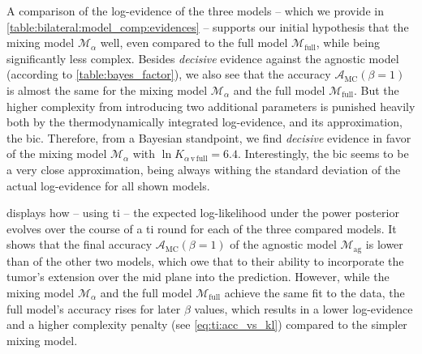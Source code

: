 \documentclass[\relativeRoot/main.tex]{subfiles}
\begin{document}
A comparison of the log-evidence of the three models -- which we provide in \cref{table:bilateral:model_comp:evidences} -- supports our initial hypothesis that the mixing model $\mathcal{M}_\alpha$ well, even compared to the full model $\mathcal{M}_\text{full}$, while being significantly less complex. Besides \emph{decisive} evidence against the agnostic model (according to \cref{table:bayes_factor}), we also see that the accuracy $\mathcal{A}_\text{MC}(\beta=1)$ is almost the same for the mixing model $\mathcal{M}_\alpha$ and the full model $\mathcal{M}_\text{full}$. But the higher complexity from introducing two additional parameters is punished heavily both by the thermodynamically integrated log-evidence, and its approximation, the \gls{bic}. Therefore, from a Bayesian standpoint, we find \emph{decisive} evidence in favor of the mixing model $\mathcal{M}_\alpha$ with $\ln{K}_{\alpha\,\text{v}\,\text{full}} = 6.4$. Interestingly, the \gls{bic} seems to be a very close approximation, being always withing the standard deviation of the actual log-evidence for all shown models.

 displays how -- using \gls{ti} -- the expected log-likelihood under the power posterior evolves over the course of a \gls{ti} round for each of the three compared models. It shows that the final accuracy $\mathcal{A}_\text{MC}(\beta=1)$ of the agnostic model $\mathcal{M}_\text{ag}$ is lower than of the other two models, which owe that to their ability to incorporate the tumor's extension over the mid plane into the prediction. However, while the mixing model $\mathcal{M}_\alpha$ and the full model $\mathcal{M}_\text{full}$ achieve the same fit to the data, the full model's accuracy rises for later $\beta$ values, which results in a lower log-evidence and a higher complexity penalty (see \cref{eq:ti:acc_vs_kl}) compared to the simpler mixing model.
\end{document}

